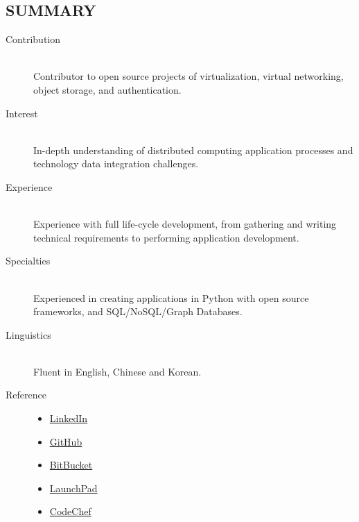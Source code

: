 \documentclass[line,margin]{res}
\begin{document}
\address{lzyeval@gmail.com}
\address{(+86) 18618475732}

\begin{resume}

\section{SUMMARY}    \begin{description}
                     \item[Contribution] \hfill \\
                     Contributor to open source projects of virtualization, virtual networking, object storage, and
                     authentication.
                     \item[Interest] \hfill \\
                     In-depth understanding of distributed computing application processes and
                     technology data integration challenges.
                     \item[Experience] \hfill \\
                     Experience with full life-cycle development,
                     from gathering and writing technical requirements to performing application development.
                     \item[Specialties] \hfill \\
                     Experienced in creating applications in Python with open source frameworks, and SQL/NoSQL/Graph Databases.
                     \item[Linguistics] \hfill \\
                     Fluent in English, Chinese and Korean.
                     \item[Reference] \hfill
                        \begin{itemize}  \itemsep -2pt %
                            \item \href{http://cn.linkedin.com/in/lzyeval}{LinkedIn}
                            \item \href{http://github.com/lzyeval}{GitHub}
                            \item \href{http://bitbucket.org/lzyeval}{BitBucket}
                            \item \href{http://launchpad.net/~lzyeval}{LaunchPad}
                            \item \href{http://www.codechef.com/users/cynah}{CodeChef}
                        \end{itemize}
                     \end{description}


\end{resume}
\end{document}
